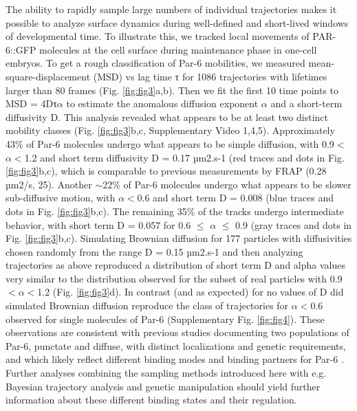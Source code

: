  The ability to rapidly sample large numbers of individual trajectories makes it possible to analyze surface dynamics during well-defined and short-lived windows of developmental time. To illustrate this, we tracked local movements of PAR-6::GFP molecules at the cell surface during maintenance phase in one-cell embryos. To get a rough classification of Par-6 mobilities, we measured mean-square-displacement (MSD) vs lag time τ for 1086 trajectories with lifetimes larger than 80 frames (Fig. \ref{fig:fig3}a,b). Then we fit the first 10 time points to MSD = 4Dτ$\alpha$ to estimate the anomalous diffusion exponent $\alpha$ and a short-term diffusivity D. This analysis revealed what appears to be at least two distinct mobility classes (Fig. \ref{fig:fig3}b,c, Supplementary Video 1,4,5). Approximately 43\% of Par-6 molecules undergo what appears to be simple diffusion, with 0.9$<$$\alpha$$<$1.2 and short term diffusivity D = 0.17 µm2.s-1 (red traces and dots in Fig. \ref{fig:fig3}b,c), which is comparable to previous measurements by FRAP (0.28 µm2/s, 25). Another $\sim$22\% of Par-6 molecules undergo what appears to be slower sub-diffusive motion, with $\alpha$$<$0.6 and short term D = 0.008 (blue traces and dots in Fig. \ref{fig:fig3}b,c). The remaining 35\% of the tracks undergo intermediate behavior, with short term D = 0.057 for 0.6 $≤$ $\alpha$ $≤$ 0.9 (gray traces and dots in Fig. \ref{fig:fig3}b,c). Simulating Brownian diffusion for 177 particles with diffusivities chosen randomly from the range D = 0.15 µm2.s-1 and then analyzing trajectories as above reproduced a distribution of short term D and alpha values very similar to the distribution observed for the subset of real particles with 0.9$<$$\alpha$$<$1.2 (Fig. \ref{fig:fig3}d). In contrast (and as expected) for no values of D did simulated Brownian diffusion reproduce the class of trajectories for $\alpha$$<$0.6 observed for single molecules of Par-6 (Supplementary Fig. \ref{fig:fig4}). These observations are consistent with previous studies documenting two populations of Par-6, punctate and diffuse, with distinct localizations and genetic requirements, and which likely reflect different binding modes and binding partners for Par-6 \cite{nmeth22}. Further analyses combining the sampling methods introduced here with e.g. Bayesian trajectory analysis \cite{nmeth28,nmeth29} and genetic manipulation should yield further information about these different binding states and their regulation.
 
